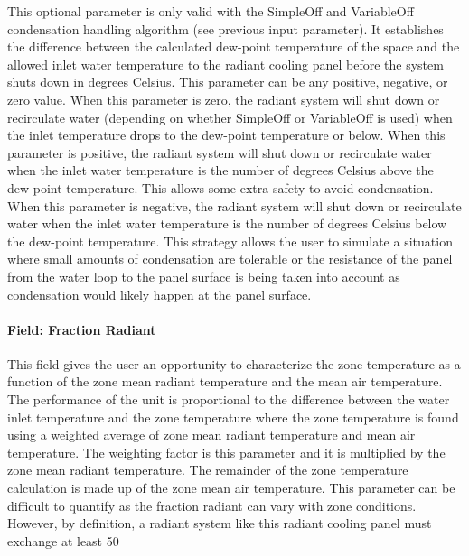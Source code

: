This optional parameter is only valid with the SimpleOff and VariableOff condensation handling algorithm (see previous input parameter). It establishes the difference between the calculated dew-point temperature of the space and the allowed inlet water temperature to the radiant cooling panel before the system shuts down in degrees Celsius. This parameter can be any positive, negative, or zero value. When this parameter is zero, the radiant system will shut down or recirculate water (depending on whether SimpleOff or VariableOff is used) when the inlet temperature drops to the dew-point temperature or below. When this parameter is positive, the radiant system will shut down or recirculate water when the inlet water temperature is the number of degrees Celsius above the dew-point temperature. This allows some extra safety to avoid condensation. When this parameter is negative, the radiant system will shut down or recirculate water when the inlet water temperature is the number of degrees Celsius below the dew-point temperature. This strategy allows the user to simulate a situation where small amounts of condensation are tolerable or the resistance of the panel from the water loop to the panel surface is being taken into account as condensation would likely happen at the panel surface.

\paragraph{Field: Fraction Radiant}\label{field-fraction-radiant-2-000-1}

This field gives the user an opportunity to characterize the zone temperature as a function of the zone mean radiant temperature and the mean air temperature.  The performance of the unit is proportional to the difference between the water inlet temperature and the zone temperature where the zone temperature is found using a weighted average of zone mean radiant temperature and mean air temperature.  The weighting factor is this parameter and it is multiplied by the zone mean radiant temperature.  The remainder of the zone temperature calculation is made up of the zone mean air temperature.  This parameter can be difficult to quantify as the fraction radiant can vary with zone conditions.  However, by definition, a radiant system like this radiant cooling panel must exchange at least 50%

